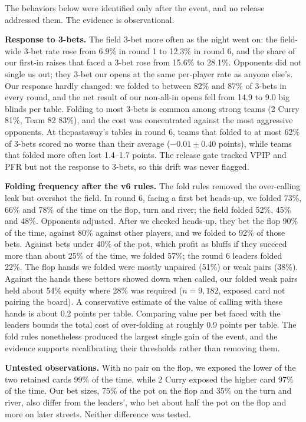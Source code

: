 \documentclass[10pt]{article}
\begin{document}
The behaviors below were identified only after the event, and no release addressed them. The evidence is observational.

\textbf{Response to 3-bets.} The field 3-bet more often as the night went on: the field-wide 3-bet rate rose from 6.9\% in round 1 to 12.3\% in round 6, and the share of our first-in raises that faced a 3-bet rose from 15.6\% to 28.1\%. Opponents did not single us out; they 3-bet our opens at the same per-player rate as anyone else's. Our response hardly changed: we folded to between 82\% and 87\% of 3-bets in every round, and the net result of our non-all-in opens fell from 14.9 to 9.0 big blinds per table. Folding to most 3-bets is common among strong teams (2 Curry 81\%, Team 82 83\%), and the cost was concentrated against the most aggressive opponents. At thepastaway's tables in round 6, teams that folded to at most 62\% of 3-bets scored no worse than their average ($-0.01\pm0.40$ points), while teams that folded more often lost 1.4--1.7 points. The release gate tracked VPIP and PFR but not the response to 3-bets, so this drift was never flagged.

\textbf{Folding frequency after the v6 rules.} The fold rules removed the over-calling leak but overshot the field. In round 6, facing a first bet heads-up, we folded 73\%, 66\% and 78\% of the time on the flop, turn and river; the field folded 52\%, 45\% and 48\%. Opponents adjusted. After we checked heads-up, they bet the flop 90\% of the time, against 80\% against other players, and we folded to 92\% of those bets. Against bets under 40\% of the pot, which profit as bluffs if they succeed more than about 25\% of the time, we folded 57\%; the round 6 leaders folded 22\%. The flop hands we folded were mostly unpaired (51\%) or weak pairs (38\%). Against the hands these bettors showed down when called, our folded weak pairs held about 54\% equity where 28\% was required ($n=9{,}182$, exposed card not pairing the board). A conservative estimate of the value of calling with these hands is about 0.2 points per table. Comparing value per bet faced with the leaders bounds the total cost of over-folding at roughly 0.9 points per table. The fold rules nonetheless produced the largest single gain of the event, and the evidence supports recalibrating their thresholds rather than removing them.

\textbf{Untested observations.} With no pair on the flop, we exposed the lower of the two retained cards 99\% of the time, while 2 Curry exposed the higher card 97\% of the time. Our bet sizes, 75\% of the pot on the flop and 35\% on the turn and river, also differ from the leaders', who bet about half the pot on the flop and more on later streets. Neither difference was tested.
\end{document}
